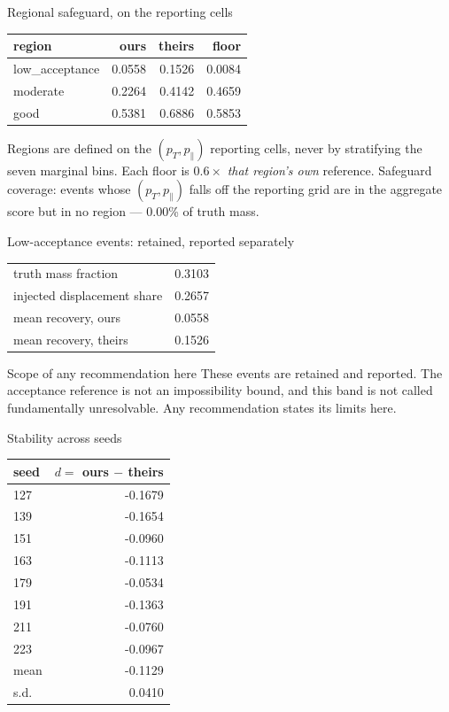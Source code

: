 \documentclass[aspectratio=169,10pt]{beamer}
\begin{document}
\begin{frame}{Regional safeguard, on the reporting cells}
\begin{center}\small
\begin{tabular}{lrrr}
\toprule
region & ours & theirs & floor \\
\midrule
low\_acceptance & 0.0558 & 0.1526 & 0.0084 \\
moderate & 0.2264 & 0.4142 & 0.4659 \\
good & 0.5381 & 0.6886 & 0.5853 \\
\bottomrule
\end{tabular}
\end{center}
Regions are defined on the $(p_T, p_\parallel)$ reporting cells, never by
stratifying the seven marginal bins. Each floor is
$0.6\times$
\emph{that region's own} reference.
\vfill
\footnotesize Safeguard coverage: events whose $(p_T, p_\parallel)$ falls off the
reporting grid are in the aggregate score but in no region ---
0.00\%
of truth mass.
\end{frame}

\begin{frame}{Low-acceptance events: retained, reported separately}
\begin{center}
\begin{tabular}{lr}
\toprule
truth mass fraction & 0.3103 \\
injected displacement share & 0.2657 \\
mean recovery, ours & 0.0558 \\
mean recovery, theirs & 0.1526 \\
\bottomrule
\end{tabular}
\end{center}
\begin{block}{Scope of any recommendation here}
These events are retained and reported. The acceptance reference is not an impossibility bound, and this band is not called fundamentally unresolvable. Any recommendation states its limits here.
\end{block}
\end{frame}

\begin{frame}{Stability across seeds}
\begin{center}\small
\begin{tabular}{lr}
\toprule
seed & $d = $ ours $-$ theirs \\
\midrule
127 & -0.1679 \\
139 & -0.1654 \\
151 & -0.0960 \\
163 & -0.1113 \\
179 & -0.0534 \\
191 & -0.1363 \\
211 & -0.0760 \\
223 & -0.0967 \\
\midrule
mean & -0.1129 \\
s.d. & 0.0410 \\
\bottomrule
\end{tabular}
\end{center}
\end{frame}
\end{document}
